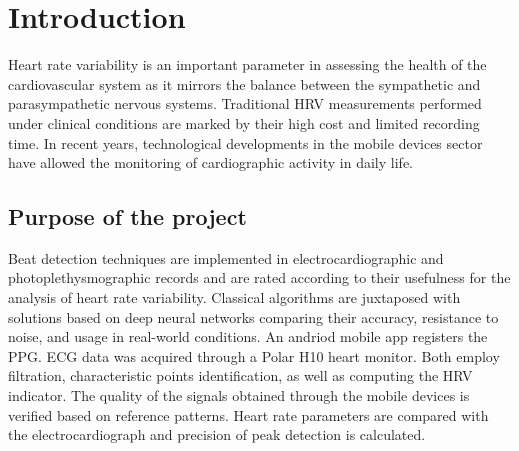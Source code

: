 \documentclass[journal]{IEEEtran}
\begin{document}
\section{Introduction}
Heart rate variability is an important parameter in assessing the health of the cardiovascular system as it mirrors the balance between the sympathetic and parasympathetic nervous systems. Traditional HRV measurements performed under clinical conditions are marked by their high cost and limited recording time. In recent years, technological developments in the mobile devices sector have allowed the monitoring of cardiographic activity in daily life.

\subsection{Purpose of the project}
Beat detection techniques are implemented in electrocardiographic and photoplethysmographic records and are rated according to their usefulness for the analysis of heart rate variability. Classical algorithms are juxtaposed with solutions based on deep neural networks comparing their accuracy, resistance to noise, and usage in real-world conditions. An andriod mobile app registers the PPG. ECG data was acquired through a Polar H10 heart monitor. Both employ filtration, characteristic points identification, as well as computing the HRV indicator. The quality of the signals obtained through the mobile devices is verified based on reference patterns. Heart rate parameters are compared with the electrocardiograph and precision of peak detection is calculated.
\end{document}

